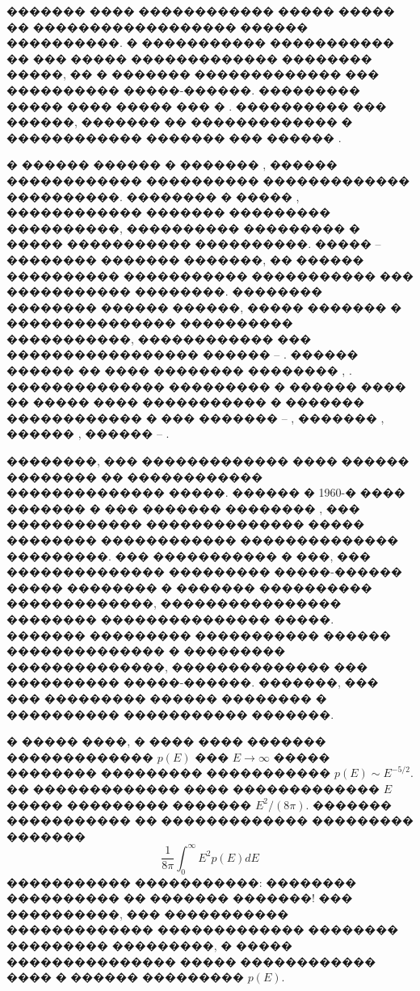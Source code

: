 \documentclass[12pt,titlepage]{article}
\begin{document}
������� ���� ������������ ����� ����� �� ������������������ ������ ����������. � ����������� ����������� �� ��� ����� ������������� �������� �����, �� � ������� ������������� ��� ���������� �����-������. ��������� ����� ���� ����� ��� � \cite{Demura}. ���������� ��� ������, ������� �� ������������� � ������������ ������� ��� ������ \cite{Demura}.

� ������ ������ � ������� \cite{Ecker1957}, \cite{Ecker1958} ������ ������������ ���������� ������������� ����������. �������� � ����� \cite{Baranger1959}, \cite{Baranger1960} ������������ ������� ��������� ����������, ���������� ��������� � ����� ����������� ����������. ����� \cite{Hooper1966} -- \cite{Hooper1968_2} �������� ������� �������, �� ������ ���������� ����������� ����������� ��� ����������� ��������. �������� �������� ������ ������, ����� ������� � ��������������� ���������� �����������, ������������ ��� ����������������� ������ \cite{Iglesias1983} -- \cite{Iglesias2000}. ������ ������ �� ���� �������� �������� \cite{Golosnoy1991}, \cite{Golosnoy1992}. �������������� ��������� � ������ ���� �� ����� ���� ����������� � ������� ������������ � ��� ������� \cite{Chandrasekhar1942} -- \cite{Chandrasekhar1943_2}, ������� \cite{Sholin1962}, ������ \cite{Sholin1969}, ������ \cite{Demura1975} -- \cite{Demura2008}.

��������, ��� ������������� ���� ������ �������� �� ������������ �������������� �����. ������ � 1960-� ���� ������� � ��� ������� �������� \cite{Tikhonov1975}, ��� ������������ �������������� ����� �������� ������������ �������������� ���������. ��� ����������� � ���, ��� �������������� ��������� �����-������ ����� �������� � ������� ���������� �������������, ���������������� �������� ��������������� �����. ������� ��������� ����������� ������ �������������� � ��������� ��������������, �������������� ��� ���������� �����-������. �������, ��� ��� ��������� ������ �������� � ���������� ����������� �������.

� ����� ����, � ���� ���� ������� ������������� $p(E)$ ��� $E \to \infty$ ����� �������� ��������� ����������� $p(E) \sim E^{-5/2}$. �� ������������� ���� ������������� $E$ ����� ��������� ������� $E^2/(8 \pi)$. %
������� ����������� �� ������������� ��������� �������
\begin{equation}
    \frac{1}{8\pi} \int_0^\infty E^2 p(E) dE
\end{equation}
����������� �����������: �������� ���������� �� ������� �������! ��� ����������, ��� ����������� ������������� ������������� �������� ��������� ���������, � ����� ��������������� ����� ������������ ���� � ������ ��������� $p(E)$.
\end{document}
